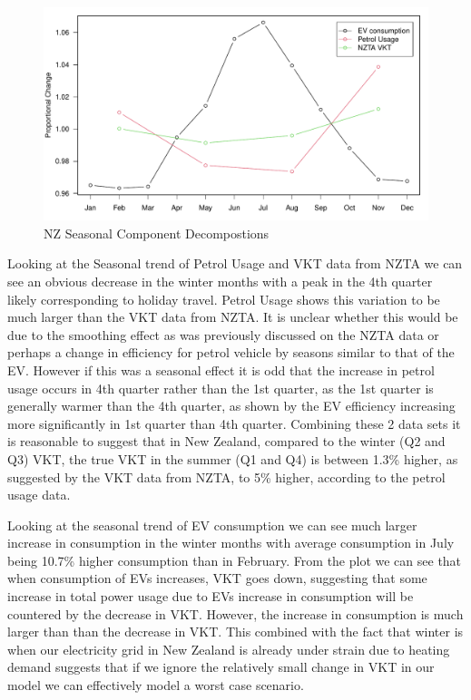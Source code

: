 \documentclass[
]{article}
\begin{document}
\begin{figure}
\centering
\includegraphics{summary_week4_files/figure-latex/petrol_VKT_vs_eff-1.pdf}
\caption{NZ Seasonal Component Decompostions}
\end{figure}

Looking at the Seasonal trend of Petrol Usage and VKT data from NZTA we
can see an obvious decrease in the winter months with a peak in the 4th
quarter likely corresponding to holiday travel. Petrol Usage shows this
variation to be much larger than the VKT data from NZTA. It is unclear
whether this would be due to the smoothing effect as was previously
discussed on the NZTA data or perhaps a change in efficiency for petrol
vehicle by seasons similar to that of the EV. However if this was a
seasonal effect it is odd that the increase in petrol usage occurs in
4th quarter rather than the 1st quarter, as the 1st quarter is generally
warmer than the 4th quarter, as shown by the EV efficiency increasing
more significantly in 1st quarter than 4th quarter. Combining these 2
data sets it is reasonable to suggest that in New Zealand, compared to
the winter (Q2 and Q3) VKT, the true VKT in the summer (Q1 and Q4) is
between 1.3\% higher, as suggested by the VKT data from NZTA, to 5\%
higher, according to the petrol usage data.

Looking at the seasonal trend of EV consumption we can see much larger
increase in consumption in the winter months with average consumption in
July being 10.7\% higher consumption than in February. From the plot we
can see that when consumption of EVs increases, VKT goes down,
suggesting that some increase in total power usage due to EVs increase
in consumption will be countered by the decrease in VKT. However, the
increase in consumption is much larger than than the decrease in VKT.
This combined with the fact that winter is when our electricity grid in
New Zealand is already under strain due to heating demand suggests that
if we ignore the relatively small change in VKT in our model we can
effectively model a worst case scenario.
\end{document}
